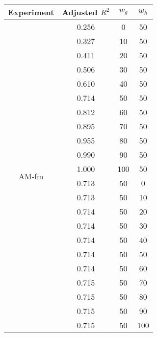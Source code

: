 \documentclass{article}
\begin{document}
\begin{table}[h]
  \centering
  \begin{tabular}{c c c c}
    \toprule
    Experiment                & Adjusted $R^2$ & $w_g$ & $w_h$ \\
    \midrule
    \multirow{22}{*}{AM-fm} & 0.256 & 0 & 50 \\
                              & 0.327 & 10  & 50 \\
                              & 0.411 & 20  & 50 \\
                              & 0.506 & 30  & 50 \\
                              & 0.610 & 40  & 50 \\
                              & 0.714 & 50  & 50 \\
                              & 0.812 & 60  & 50 \\
                              & 0.895 & 70  & 50 \\
                              & 0.955 & 80  & 50 \\
                              & 0.990 & 90  & 50 \\
                              & 1.000 & 100 & 50 \\
                              & 0.713 & 50  & 0 \\
                              & 0.713 & 50  & 10 \\
                              & 0.714 & 50  & 20 \\
                              & 0.714 & 50  & 30 \\
                              & 0.714 & 50  & 40 \\
                              & 0.714 & 50  & 50 \\
                              & 0.714 & 50  & 60 \\
                              & 0.715 & 50  & 70 \\
                              & 0.715 & 50  & 80 \\
                              & 0.715 & 50  & 90 \\
                              & 0.715 & 50  & 100 \\
    \bottomrule
  \end{tabular}
\end{table}
\end{document}
